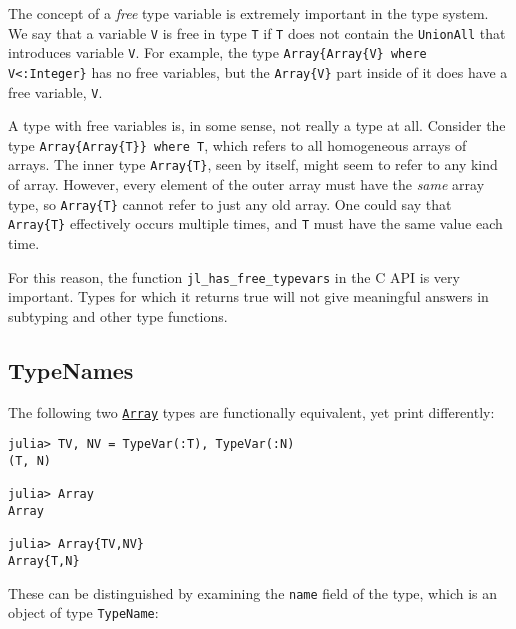 The concept of a \emph{free} type variable is extremely important in the type system. We say that a variable \texttt{V} is free in type \texttt{T} if \texttt{T} does not contain the \texttt{UnionAll} that introduces variable \texttt{V}. For example, the type \texttt{Array\{Array\{V\} where V<:Integer\}} has no free variables, but the \texttt{Array\{V\}} part inside of it does have a free variable, \texttt{V}.



A type with free variables is, in some sense, not really a type at all. Consider the type \texttt{Array\{Array\{T\}\} where T}, which refers to all homogeneous arrays of arrays. The inner type \texttt{Array\{T\}}, seen by itself, might seem to refer to any kind of array. However, every element of the outer array must have the \emph{same} array type, so \texttt{Array\{T\}} cannot refer to just any old array. One could say that \texttt{Array\{T\}} effectively {\textquotedbl}occurs{\textquotedbl} multiple times, and \texttt{T} must have the same value each {\textquotedbl}time{\textquotedbl}.



For this reason, the function \texttt{jl\_has\_free\_typevars} in the C API is very important. Types for which it returns true will not give meaningful answers in subtyping and other type functions.



\hypertarget{9475610527503799038}{}


\subsection{TypeNames}



The following two \hyperlink{15492651498431872487}{\texttt{Array}} types are functionally equivalent, yet print differently:




\begin{verbatim}
julia> TV, NV = TypeVar(:T), TypeVar(:N)
(T, N)

julia> Array
Array

julia> Array{TV,NV}
Array{T,N}
\end{verbatim}



These can be distinguished by examining the \texttt{name} field of the type, which is an object of type \texttt{TypeName}:




